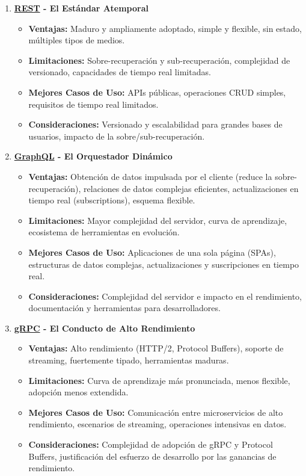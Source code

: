 \begin{enumerate}
    \item \textbf{\hyperlink{rest}{REST} - El Estándar Atemporal}
    \begin{itemize}
        \item \textbf{Ventajas:} Maduro y ampliamente adoptado, simple y flexible, sin estado, múltiples tipos de medios.
        \item \textbf{Limitaciones:} Sobre-recuperación y sub-recuperación, complejidad de versionado, capacidades de tiempo real limitadas.
        \item \textbf{Mejores Casos de Uso:} APIs públicas, operaciones CRUD simples, requisitos de tiempo real limitados.
        \item \textbf{Consideraciones:} Versionado y escalabilidad para grandes bases de usuarios, impacto de la sobre/sub-recuperación.
    \end{itemize}

    \item \textbf{\hyperlink{graphql}{GraphQL} - El Orquestador Dinámico}
    \begin{itemize}
        \item \textbf{Ventajas:} Obtención de datos impulsada por el cliente (reduce la sobre-recuperación), relaciones de datos complejas eficientes, actualizaciones en tiempo real (subscriptions), esquema flexible.
        \item \textbf{Limitaciones:} Mayor complejidad del servidor, curva de aprendizaje, ecosistema de herramientas en evolución.
        \item \textbf{Mejores Casos de Uso:} Aplicaciones de una sola página (SPAs), estructuras de datos complejas, actualizaciones y suscripciones en tiempo real.
        \item \textbf{Consideraciones:} Complejidad del servidor e impacto en el rendimiento, documentación y herramientas para desarrolladores.
    \end{itemize}

    \item \textbf{\hyperlink{grpc}{gRPC} - El Conducto de Alto Rendimiento}
    \begin{itemize}
        \item \textbf{Ventajas:} Alto rendimiento (HTTP/2, Protocol Buffers), soporte de streaming, fuertemente tipado, herramientas maduras.
        \item \textbf{Limitaciones:} Curva de aprendizaje más pronunciada, menos flexible, adopción menos extendida.
        \item \textbf{Mejores Casos de Uso:} Comunicación entre microservicios de alto rendimiento, escenarios de streaming, operaciones intensivas en datos.
        \item \textbf{Consideraciones:} Complejidad de adopción de gRPC y Protocol Buffers, justificación del esfuerzo de desarrollo por las ganancias de rendimiento.
    \end{itemize}
\end{enumerate}

